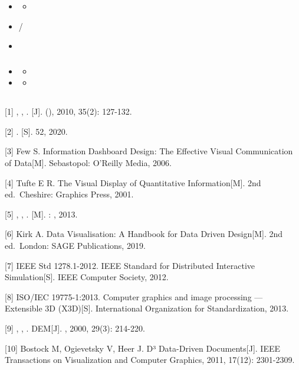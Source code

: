 \begin{itemize}
\item
  \begin{itemize}
  \tightlist
  \item
  \end{itemize}
\item
  /
\item ~
  \hypertarget{section-20}{%
  \subsubsection{}\label{section-20}}
\item
  \begin{itemize}
  \tightlist
  \item
  \end{itemize}
\item
  \begin{itemize}
  \tightlist
  \item
  \end{itemize}
\end{itemize}

\hypertarget{section-21}{%
\subsection{}\label{section-21}}

{[}1{]} , , . {[}J{]}. (), 2010, 35(2): 127-132.

{[}2{]} . {[}S{]}. 52, 2020.

{[}3{]} Few S. Information Dashboard Design: The Effective Visual
Communication of Data{[}M{]}. Sebastopol: O'Reilly Media, 2006.

{[}4{]} Tufte E R. The Visual Display of Quantitative
Information{[}M{]}. 2nd ed.~Cheshire: Graphics Press, 2001.

{[}5{]} , , . {[}M{]}. : , 2013.

{[}6{]} Kirk A. Data Visualisation: A Handbook for Data Driven
Design{[}M{]}. 2nd ed.~London: SAGE Publications, 2019.

{[}7{]} IEEE Std 1278.1-2012. IEEE Standard for Distributed Interactive
Simulation{[}S{]}. IEEE Computer Society, 2012.

{[}8{]} ISO/IEC 19775-1:2013. Computer graphics and image processing ---
Extensible 3D (X3D){[}S{]}. International Organization for
Standardization, 2013.

{[}9{]} , , . DEM{[}J{]}. , 2000, 29(3): 214-220.

{[}10{]} Bostock M, Ogievetsky V, Heer J. D³ Data-Driven
Documents{[}J{]}. IEEE Transactions on Visualization and Computer
Graphics, 2011, 17(12): 2301-2309.

